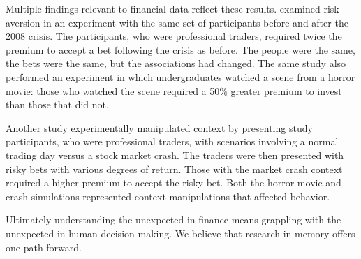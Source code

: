 Multiple findings relevant to financial data reflect these results. \citet{guiso2018time} examined risk aversion in an experiment with the same set of participants before and after the 2008 crisis. The participants, who were professional traders, required twice the premium to accept a bet following the crisis as before. The people were the same, the bets were the same, but the associations had changed. The same study also performed an experiment in which undergraduates watched a scene from a horror movie: those who watched the scene required a 50\% greater premium to invest than those that did not. 

Another study \citep{cohn2015evidence} experimentally manipulated context by presenting study participants, who were professional traders, with scenarios involving a normal trading day versus a stock market crash. The traders were then presented with risky bets with various degrees of return. Those with the market crash context required a higher premium to accept the risky bet. Both the horror movie and crash simulations represented context manipulations that affected behavior.  
 
Ultimately understanding the unexpected in finance means grappling with the unexpected in human decision-making. We believe that research in memory offers one path forward.
